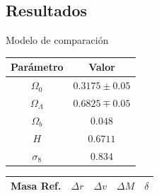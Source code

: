 \documentclass{beamer}
\begin{document}
\subsection{Resultados}
\begin{frame}{Modelo de comparación}
	\begin{table}[H]
		\centering
		\begin{tabular}{cc}
			\hline
			\textbf{Parámetro} & \textbf{Valor} 		\\
			\hline
			$\Omega_0$ 			& $0.3175\pm0.05$ 	\\
			$\Omega_\Lambda$ 	& $0.6825 \mp 0.05$	\\
			$\Omega_b$ 			& $0.048$			\\
			$H$					& $0.6711$			\\
			$\sigma_8$			& $0.834$			\\
			\hline
		\end{tabular}
		\label{tab:param}
	\end{table}
	
	\begin{table}
		\centering
		\begin{tabular}{ccccc}
		\hline \hline
		Masa Ref. & $\Delta r$ & $\Delta v$ & $\Delta M$ & $\delta$\\
		\hline
		\end{tabular}
		\label{tab:an}
	\end{table}
\end{frame}
\end{document}
